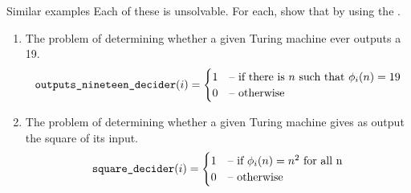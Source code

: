 \documentclass[9pt,t,serif,professionalfont,xcolor={table,dvipsnames},noamsthm]{beamer}
\begin{document}
\begin{frame}{Similar examples}
Each of these is unsolvable.
For each, show that by using the \HP{}.
\begin{enumerate}
\item The problem of determining whether a given Turing machine ever
  outputs a 19.
  \begin{equation*}
    \operatorname{\texttt{outputs\_nineteen\_decider}}(i)=
    \begin{cases}
      1  &\text{-- if there is $n$ such that $\phi_i(n)=19$}  \\
      0  &\text{-- otherwise}
    \end{cases}
  \end{equation*}
\item The problem of determining whether a given Turing machine 
  gives as output the square of its input.
  \begin{equation*}
    \operatorname{\texttt{square\_decider}}(i)=
    \begin{cases}
      1  &\text{-- if $\phi_i(n)=n^2$ for all n}  \\
      0  &\text{-- otherwise}
    \end{cases}
  \end{equation*}
\end{enumerate}
\end{frame}
\end{document}
